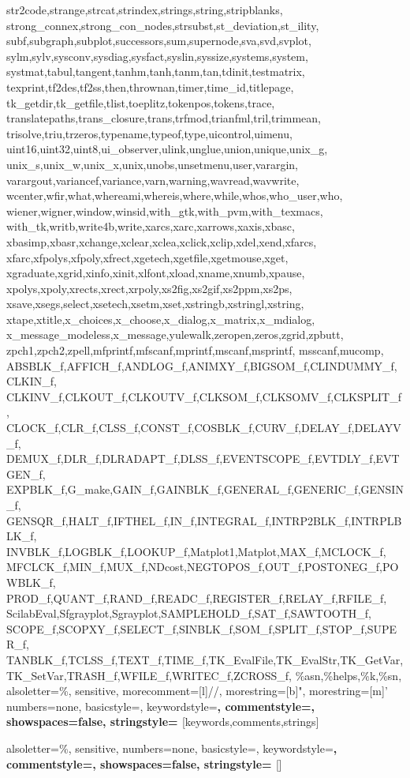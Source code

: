{{      str2code,strange,strcat,strindex,strings,string,stripblanks,%
      strong_connex,strong_con_nodes,strsubst,st_deviation,st_ility,%
      subf,subgraph,subplot,successors,sum,supernode,sva,svd,svplot,%
      sylm,sylv,sysconv,sysdiag,sysfact,syslin,syssize,systems,system,%
      systmat,tabul,tangent,tanhm,tanh,tanm,tan,tdinit,testmatrix,%
      texprint,tf2des,tf2ss,then,thrownan,timer,time_id,titlepage,%
      tk_getdir,tk_getfile,tlist,toeplitz,tokenpos,tokens,trace,%
      translatepaths,trans_closure,trans,trfmod,trianfml,tril,trimmean,%
      trisolve,triu,trzeros,typename,typeof,type,uicontrol,uimenu,%
      uint16,uint32,uint8,ui_observer,ulink,unglue,union,unique,unix_g,%
      unix_s,unix_w,unix_x,unix,unobs,unsetmenu,user,varargin,%
      varargout,variancef,variance,varn,warning,wavread,wavwrite,%
      wcenter,wfir,what,whereami,whereis,where,while,whos,who_user,who,%
      wiener,wigner,window,winsid,with_gtk,with_pvm,with_texmacs,%
      with_tk,writb,write4b,write,xarcs,xarc,xarrows,xaxis,xbasc,%
      xbasimp,xbasr,xchange,xclear,xclea,xclick,xclip,xdel,xend,xfarcs,%
      xfarc,xfpolys,xfpoly,xfrect,xgetech,xgetfile,xgetmouse,xget,%
      xgraduate,xgrid,xinfo,xinit,xlfont,xload,xname,xnumb,xpause,%
      xpolys,xpoly,xrects,xrect,xrpoly,xs2fig,xs2gif,xs2ppm,xs2ps,%
      xsave,xsegs,select,xsetech,xsetm,xset,xstringb,xstringl,xstring,%
      xtape,xtitle,x_choices,x_choose,x_dialog,x_matrix,x_mdialog,%
      x_message_modeless,x_message,yulewalk,zeropen,zeros,zgrid,zpbutt,%
      zpch1,zpch2,zpell,mfprintf,mfscanf,mprintf,mscanf,msprintf,%
      msscanf,mucomp,%
      ABSBLK_f,AFFICH_f,ANDLOG_f,ANIMXY_f,BIGSOM_f,CLINDUMMY_f,CLKIN_f,%
      CLKINV_f,CLKOUT_f,CLKOUTV_f,CLKSOM_f,CLKSOMV_f,CLKSPLIT_f,%
      CLOCK_f,CLR_f,CLSS_f,CONST_f,COSBLK_f,CURV_f,DELAY_f,DELAYV_f,%
      DEMUX_f,DLR_f,DLRADAPT_f,DLSS_f,EVENTSCOPE_f,EVTDLY_f,EVTGEN_f,%
      EXPBLK_f,G_make,GAIN_f,GAINBLK_f,GENERAL_f,GENERIC_f,GENSIN_f,%
      GENSQR_f,HALT_f,IFTHEL_f,IN_f,INTEGRAL_f,INTRP2BLK_f,INTRPLBLK_f,%
      INVBLK_f,LOGBLK_f,LOOKUP_f,Matplot1,Matplot,MAX_f,MCLOCK_f,%
      MFCLCK_f,MIN_f,MUX_f,NDcost,NEGTOPOS_f,OUT_f,POSTONEG_f,POWBLK_f,%
      PROD_f,QUANT_f,RAND_f,READC_f,REGISTER_f,RELAY_f,RFILE_f,%
      ScilabEval,Sfgrayplot,Sgrayplot,SAMPLEHOLD_f,SAT_f,SAWTOOTH_f,%
      SCOPE_f,SCOPXY_f,SELECT_f,SINBLK_f,SOM_f,SPLIT_f,STOP_f,SUPER_f,%
      TANBLK_f,TCLSS_f,TEXT_f,TIME_f,TK_EvalFile,TK_EvalStr,TK_GetVar,%
      TK_SetVar,TRASH_f,WFILE_f,WRITEC_f,ZCROSS_f,%
      \%asn,\%helps,\%k,\%sn},%
   alsoletter=\%,%
   sensitive,%
   morecomment=[l]//,%
   morestring=[b]",%
   morestring=[m]'%
   numbers=none,%
   basicstyle=\small\ttfamily ,%
   keywordstyle=\bfseries,%
   commentstyle=\bfseries,%
   showspaces=false,%
   stringstyle=\bfseries
  }[keywords,comments,strings]%

%
  {alsoletter=\%,
   sensitive,%
   numbers=none,%
   basicstyle=\small\ttfamily ,%
   keywordstyle=\bfseries,%
   commentstyle=\bfseries,%
   showspaces=false,%
   stringstyle=\bfseries
  }[]%

